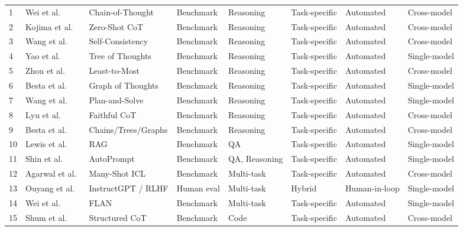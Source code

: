 \documentclass[journal]{IEEEtran}
\begin{document}
{\begin{longtable}{C{0.50cm}L{3.20cm}L{3.10cm}C{2.35cm}C{1.85cm}C{1.95cm}C{1.95cm}C{1.85cm}}
\bottomrule
\endlastfoot
{}
1 & Wei et al.~\cite{wei2022chain} & Chain-of-Thought & Benchmark & Reasoning & Task-specific & Automated & Cross-model \\
2 & Kojima et al.~\cite{kojima2022large} & Zero-Shot CoT & Benchmark & Reasoning & Task-specific & Automated & Cross-model \\
3 & Wang et al.~\cite{wang2023selfconsistency} & Self-Consistency & Benchmark & Reasoning & Task-specific & Automated & Cross-model \\
4 & Yao et al.~\cite{yao2023tree} & Tree of Thoughts & Benchmark & Reasoning & Task-specific & Automated & Single-model \\
5 & Zhou et al.~\cite{leasttomost2022} & Least-to-Most & Benchmark & Reasoning & Task-specific & Automated & Cross-model \\
6 & Besta et al.~\cite{graphofthoughts2023} & Graph of Thoughts & Benchmark & Reasoning & Task-specific & Automated & Single-model \\
7 & Wang et al.~\cite{plansolve2023} & Plan-and-Solve & Benchmark & Reasoning & Task-specific & Automated & Single-model \\
8 & Lyu et al.~\cite{faithfulcot2023} & Faithful CoT & Benchmark & Reasoning & Task-specific & Automated & Cross-model \\
9 & Besta et al.~\cite{demystifying2024} & Chains/Trees/Graphs & Benchmark & Reasoning & Task-specific & Automated & Cross-model \\
10 & Lewis et al.~\cite{lewis2020retrieval} & RAG & Benchmark & QA & Task-specific & Automated & Single-model \\
11 & Shin et al.~\cite{shin2020autoprompt} & AutoPrompt & Benchmark & QA, Reasoning & Task-specific & Automated & Single-model \\
12 & Agarwal et al.~\cite{manyshot2024} & Many-Shot ICL & Benchmark & Multi-task & Task-specific & Automated & Cross-model \\
13 & Ouyang et al.~\cite{ouyang2022training} & InstructGPT / RLHF & Human eval & Multi-task & Hybrid & Human-in-loop & Single-model \\
14 & Wei et al.~\cite{wei2022flan} & FLAN & Benchmark & Multi-task & Task-specific & Automated & Single-model \\
15 & Shum et al.~\cite{scoT2023} & Structured CoT & Benchmark & Code & Task-specific & Automated & Cross-model \\

\end{longtable}}
\end{document}
